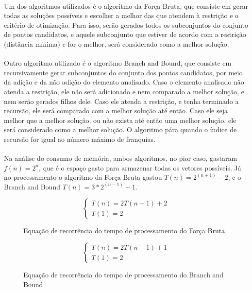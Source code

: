 \documentclass[12pt]{article}
\begin{document}
\paragraph{}Um dos algoritmos utilizados é o algoritmo da Força Bruta, que consiste em gerar todas as soluções possíveis e escolher a melhor das que atendem à restrição e o critério de otimização. Para isso, serão gerados todos os subconjuntos do conjunto de pontos candidatos, e aquele subconjunto que estiver de acordo com a restrição (distância mínima) e for o melhor, será considerado como a melhor solução.

\paragraph{}Outro algoritmo utilizado é o algoritmo Branch and Bound, que consiste em recursivamente gerar subconjuntos do conjunto dos pontos candidatos, por meio da adição e da não adição do elemento analisado. Caso o elemento analisado não atenda a restrição, ele não será adicionado e nem comparado a melhor solução, e nem serão gerados filhos dele. Caso ele atenda a restrição, e tenha terminado a recursão, ele será comparado com a melhor solução até então. Caso ele seja melhor que a melhor solução, ou não exista até então uma melhor solução, ele será considerado como a melhor solução. O algoritmo pára quando o índice de recursão for igual ao número máximo de franquias.

\paragraph{}Na análise do consumo de memória, ambos algoritmos, no pior caso, gastaram 
\(f(n)=2^{n}\), que é o espaço gasto para armazenar todas os vetores possíveis. Já no processamento o algoritmo da Força Bruta gastou \(T(n)=2^{(n+1)}-2\), e o Branch and Bound \(T(n)=3*2^{(n-1)}+1\).

\begin{figure}[H]
    \centering
    \begin{equation}
        \begin{cases}
        T(n) = 2T(n-1)+2 \\
        T(1) = 2
        \end{cases}
    \end{equation}
    \caption{Equação de recorrência do tempo de processamento do Força Bruta}
    \label{fig:eq-1}
\end{figure}

\begin{figure}[H]
    \centering
    \begin{equation}
        \begin{cases}
            T(n) = 2T(n-1)+1\\
            T(1) = 2
        \end{cases}
    \end{equation}
    \caption{Equação de recorrência do tempo de processamento do Branch and Bound}
    \label{fig:eq-2}
\end{figure}
\end{document}
